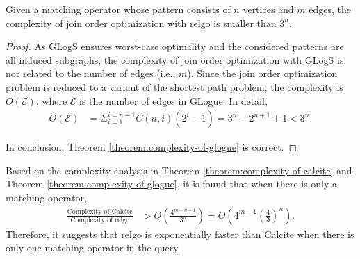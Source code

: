\begin{theorem}
    \label{theorem:complexity-of-glogue}
    Given a matching operator whose pattern consists of $n$ vertices and $m$ edges, the complexity of join order optimization with relgo is smaller than $3^n$.
\end{theorem}
\begin{proof}

    As GLogS ensures worst-case optimality and the considered patterns are all induced subgraphs, the complexity of join order optimization with GLogS is not related to the number of edges (i.e., $m$).
    Since the join order optimization problem is reduced to a variant of the shortest path problem, the complexity is $O(\mathcal{E})$, where $\mathcal{E}$ is the number of edges in GLogue.
    In detail, 
    \begin{equation*}
        \begin{split}
            O(\mathcal{E}) & = \Sigma_{i=1}^{i=n-1}C(n, i)(2^i - 1) = 3^n - 2^{n+1} +1 < 3^n.
        \end{split}
    \end{equation*}
    
    In conclusion, Theorem \ref{theorem:complexity-of-glogue} is correct.

\end{proof}

Based on the complexity analysis in Theorem \ref{theorem:complexity-of-calcite} and Theorem \ref{theorem:complexity-of-glogue}, it is found that when there is only a matching operator, 
\begin{equation*}
    \begin{split}
        \frac{\text{Complexity of Calcite}}{\text{Complexity of relgo}} & > O(\frac{4^{m+n-1}}{3^n}) = O(4^{m-1}(\frac{4}{3})^n).
    \end{split}
\end{equation*}
Therefore, it suggests that relgo is exponentially faster than Calcite when there is only one matching operator in the query.


